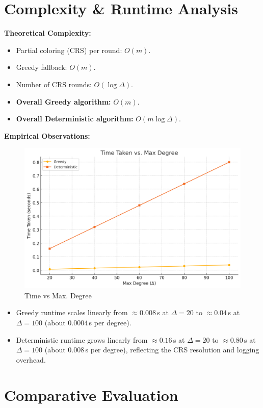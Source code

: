 \documentclass[11pt]{article}
\begin{document}
\section{Complexity \& Runtime Analysis}

\textbf{Theoretical Complexity:}
\begin{itemize}
  \item Partial coloring (CRS) per round: $O(m)$.
  \item Greedy fallback: $O(m)$.
  \item Number of CRS rounds: $O(\log \Delta)$.
  \item \textbf{Overall Greedy algorithm:} $O(m)$.
  \item \textbf{Overall Deterministic algorithm:} $O(m \log \Delta)$.
\end{itemize}

\textbf{Empirical Observations:}
\begin{figure}[H]
    \centering
    \includegraphics[width=0.5\linewidth]{time vs max degree.png}
    \caption{Time vs Max. Degree}
    \label{fig:enter-label}
\end{figure}
\begin{itemize}
  \item Greedy runtime scales linearly from $\approx0.008\,$s at $\Delta=20$ to $\approx0.04\,$s at $\Delta=100$ (about $0.0004\,$s per degree).
  \item Deterministic runtime grows linearly from $\approx0.16\,$s at $\Delta=20$ to $\approx0.80\,$s at $\Delta=100$ (about $0.008\,$s per degree), reflecting the CRS resolution and logging overhead.
\end{itemize}


\section{Comparative Evaluation}
\end{document}
